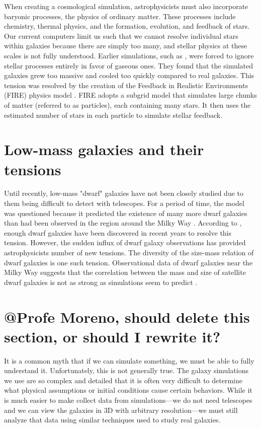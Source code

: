 When creating a cosmological simulation, astrophysicists must also incorporate baryonic processes, the physics of ordinary matter. These processes include chemistry, thermal physics, and the formation, evolution, and feedback of stars. Our current computers limit us such that we cannot resolve individual stars within galaxies \citep{feldmannFIREboxSimulatingGalaxies2022} because there are simply too many, and stellar physics at these scales is not fully understood. Earlier simulations, such as \cite{bournaudISMPropertiesHydrodynamic2010}, were forced to ignore stellar processes entirely in favor of gaseous ones. They found that the simulated galaxies grew too massive and cooled too quickly compared to real galaxies. This tension was resolved by the creation of the Feedback in Realistic Environments (FIRE) physics model \citep{hopkinsFIRE2SimulationsPhysics2018}. FIRE adopts a subgrid model that simulates large chunks of matter (referred to as particles), each containing many stars. It then uses the estimated number of stars in each particle to simulate stellar feedback. 

\section{Low-mass galaxies and their tensions}
Until recently, low-mass "dwarf" galaxies have not been closely studied due to them being difficult to detect with telescopes. For a period of time, the \lcdm\* model was questioned because it predicted the existence of many more dwarf galaxies than had been observed in the region around the Milky Way \citep{salesBaryonicSolutionsChallenges2022}. According to \cite{salesBaryonicSolutionsChallenges2022}, enough dwarf galaxies have been discovered in recent years to resolve this tension. However, the sudden influx of dwarf galaxy observations has provided astrophysicists number of new tensions. The diversity of the size-mass relation of dwarf galaxies is one such tension. Observational data of dwarf galaxies near the Milky Way suggests that the correlation between the mass and size of satellite dwarf galaxies is not as strong as simulations seem to predict \citep{salesBaryonicSolutionsChallenges2022}. 

\section{@Profe Moreno, should delete this section, or should I rewrite it?}
It is a common myth that if we can simulate something, we must be able to fully understand it. Unfortunately, this is not generally true. The galaxy simulations we use are so complex and detailed that it is often very difficult to determine what physical assumptions or initial conditions cause certain behaviors. While it is much easier to make collect data from simulations---we do not need telescopes and we can view the galaxies in 3D with arbitrary resolution---we must still analyze that data using similar techniques used to study real galaxies.

